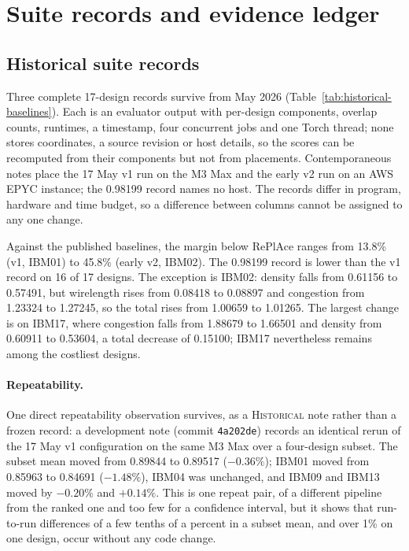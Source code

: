 \section{Suite records and evidence ledger}\label{app:records}

\providecommand{\official}{\textsc{Official}}
\providecommand{\historical}{\textsc{Historical}}
\providecommand{\measurement}{\textsc{Measurement}}
\providecommand{\reproduction}{\textsc{Reproduction}}

\subsection{Historical suite records}\label{app:records-historical}

Three complete 17-design records survive from May 2026
(Table~\ref{tab:historical-baselines}). Each is an evaluator output with per-design
components, overlap counts, runtimes, a timestamp, four concurrent jobs and one Torch
thread; none stores coordinates, a source revision or host details, so the scores can
be recomputed from their components but not from placements. Contemporaneous notes
place the 17 May v1 run on the M3 Max and the early v2 run on an AWS EPYC instance;
the 0.98199 record names no host. The records differ in program, hardware and
time budget, so a difference between columns cannot be assigned to any one change.



Against the published baselines, the margin below RePlAce ranges from 13.8\% (v1,
IBM01) to 45.8\% (early v2, IBM02). The 0.98199 record is lower than the v1
record on 16 of 17 designs. The exception is IBM02: density falls from 0.61156 to
0.57491, but wirelength rises from 0.08418 to 0.08897 and congestion from 1.23324 to
1.27245, so the total rises from 1.00659 to 1.01265. The largest change is on IBM17,
where congestion falls from 1.88679 to 1.66501 and density from 0.60911 to 0.53604, a
total decrease of 0.15100; IBM17 nevertheless remains among the costliest designs.

\paragraph{Repeatability.} One direct repeatability observation survives, as a
\historical{} note rather than a frozen record: a development note (commit
\texttt{4a202de}) records an identical rerun of the 17 May v1 configuration on the same
M3 Max over a four-design subset. The subset mean moved from 0.89844 to 0.89517
($-0.36\%$); IBM01 moved from 0.85963 to 0.84691 ($-1.48\%$), IBM04 was unchanged, and
IBM09 and IBM13 moved by $-0.20\%$ and $+0.14\%$. This is one repeat pair, of a
different pipeline from the ranked one and too few for a confidence interval, but it
shows that run-to-run differences of a few tenths of a percent in a subset mean, and
over 1\% on one design, occur without any code change.

